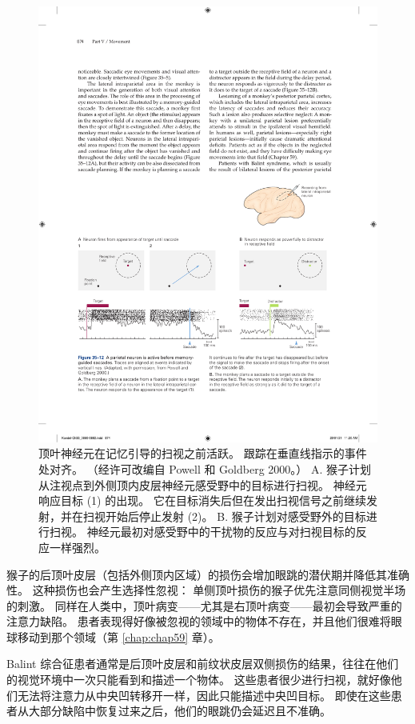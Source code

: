 \begin{figure}[htbp]
	\centering
	\includegraphics[width=0.95\linewidth]{chap35/fig_35_12}
	\caption{顶叶神经元在记忆引导的扫视之前活跃。 跟踪在垂直线指示的事件处对齐。 （经许可改编自 Powell 和 Goldberg 2000。） A. 猴子计划从注视点到外侧顶内皮层神经元感受野中的目标进行扫视。 神经元响应目标 (1) 的出现。 它在目标消失后但在发出扫视信号之前继续发射，并在扫视开始后停止发射 (2)。 B. 猴子计划对感受野外的目标进行扫视。 神经元最初对感受野中的干扰物的反应与对扫视目标的反应一样强烈。}
	\label{fig:35_12}
\end{figure}


猴子的后顶叶皮层（包括外侧顶内区域）的损伤会增加眼跳的潜伏期并降低其准确性。 这种损伤也会产生选择性忽视：
单侧顶叶损伤的猴子优先注意同侧视觉半场的刺激。 同样在人类中，顶叶病变——尤其是右顶叶病变——最初会导致严重的注意力缺陷。
患者表现得好像被忽视的领域中的物体不存在，并且他们很难将眼球移动到那个领域（第 \ref{chap:chap59} 章）。


Balint 综合征患者通常是后顶叶皮层和前纹状皮层双侧损伤的结果，往往在他们的视觉环境中一次只能看到和描述一个物体。
这些患者很少进行扫视，就好像他们无法将注意力从中央凹转移开一样，因此只能描述中央凹目标。
即使在这些患者从大部分缺陷中恢复过来之后，他们的眼跳仍会延迟且不准确。



